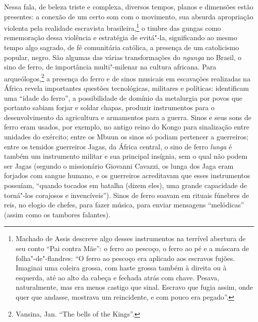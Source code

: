 Nessa fala, de beleza triste e complexa, diversos tempos, planos e
dimensões estão presentes: a conexão de um certo som com o movimento,
sua absurda apropriação violenta pela realidade escravista
brasileira,\footnote{Machado de Assis descreve algo desses instrumentos
  na terrível abertura de seu conto ``Pai contra Mãe'': o ferro ao
  pescoço, o ferro ao pé e a máscara de folha"-de"-flandres: ``O ferro ao
  pescoço era aplicado aos escravos fujões. Imaginai uma coleira grossa,
  com haste grossa também à direita ou à esquerda, até ao alto da cabeça
  e fechada atrás com chave. Pesava, naturalmente, mas era menos castigo
  que sinal. Escravo que fugia assim, onde quer que andasse, mostrava um
  reincidente, e com pouco era pegado''.} o timbre das gungas como
rememoração dessa violência e estratégia de evitá"-la, significando ao
mesmo tempo algo sagrado, de fé comunitária católica, a presença de um
catolicismo popular, negro. São algumas das várias transformações do
\emph{ngunga} no Brasil, o sino de ferro, de importância multi"-milenar
na cultura africana. Para arqueólogos,\footnote{Vansina, Jan. ``The
  bells of the Kings''.} a presença do ferro e de sinos musicais em
escavações realizadas na África revela importantes questões
tecnológicas, militares e políticas: identificam uma ``idade do ferro'',
a possibilidade de domínio da metalurgia por povos que portanto sabiam
forjar e soldar chapas, produzir instrumentos para o desenvolvimento da
agricultura e armamentos para a guerra. Sinos e seus sons de ferro eram
usados, por exemplo, no antigo reino do Kongo para sinalização entre
unidades do exército; entre os Mbuun os sinos só podiam pertencer a
guerreiros; entre os temidos guerreiros Jagas, da África central, o sino
de ferro \emph{lunga} é também um instrumento militar e sua principal
insígnia, sem o qual não podem ser Jagas (segundo o missionário Giovanni
Cavazzi, os lunga dos Jaga eram forjados com sangue humano, e os
guerreiros acreditavam que esses instrumentos possuíam, ``quando tocados
em batalha (dizem eles), uma grande capacidade de torná"-los corajosos e
invencíveis''). Sinos de ferro soavam em rituais fúnebres de reis, no
elogio de chefes, para fazer música, para enviar mensagens ``melódicas''
(assim como os tambores falantes).

